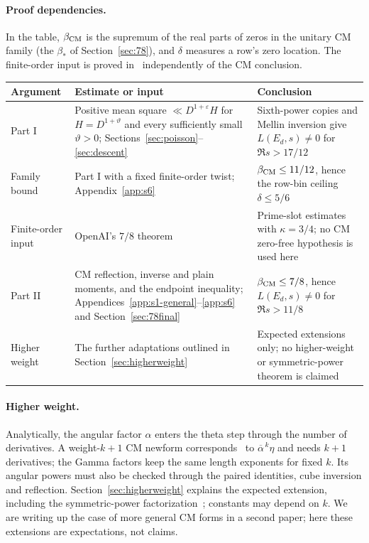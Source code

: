 \documentclass[11pt]{article}
\numberwithin{equation}{section}
\begin{document}
\noindent\begin{minipage}{\linewidth}
\paragraph{Proof dependencies.}
In the table, $\beta_{\rm CM}$ is the supremum of the real parts of zeros in the
unitary CM family (the $\beta_*$ of Section~\ref{sec:78}), and $\delta$ measures a
row's zero location. The finite-order input is proved in~\cite{OAI78} independently
of the CM conclusion.
\begin{center}
\small
\begin{tabular}{>{\raggedright\arraybackslash}p{1.9cm}>{\raggedright\arraybackslash}p{6.1cm}>{\raggedright\arraybackslash}p{6.1cm}}
\toprule
Argument & Estimate or input & Conclusion\\\midrule
Part I & Positive mean square $\ll D^{1+\varepsilon}H$ for
 $H=D^{1+\vartheta}$ and every sufficiently small $\vartheta>0$;
 Sections~\ref{sec:poisson}--\ref{sec:descent} &
 Sixth-power copies and Mellin inversion give
 $L(E_d,s)\ne0$ for $\Re s>17/12$\\
Family bound & Part I with a fixed finite-order twist;
 Appendix~\ref{app:s6} & $\beta_{\rm CM}\le11/12$, hence the row-bin ceiling
 $\delta\le5/6$\\
Finite-order input & OpenAI's $7/8$ theorem~\cite{OAI78} &
 Prime-slot estimates with $\kappa=3/4$;
 no CM zero-free hypothesis is used here\\
Part II & CM reflection, inverse and plain moments,
 and the endpoint inequality; Appendices~\ref{app:s1-general}--\ref{app:s6}
 and Section~\ref{sec:78final} & $\beta_{\rm CM}\le7/8$, hence
 $L(E_d,s)\ne0$ for $\Re s>11/8$\\
Higher weight & The further adaptations outlined in
 Section~\ref{sec:higherweight} & Expected extensions only;
 no higher-weight or symmetric-power theorem is claimed\\\bottomrule
\end{tabular}
\end{center}
\end{minipage}

\paragraph{Higher weight.} Analytically, the angular factor $\alpha$ enters the theta step
through the number of derivatives. A weight-$k+1$ CM newform corresponds~\cite{Shimura71,Ribet77}
to $\overline\alpha^{\,k}\eta$ and needs $k+1$ derivatives; the Gamma factors keep
the same length exponents for fixed $k$. Its angular powers must also be checked
through the paired identities, cube inversion and reflection.
Section~\ref{sec:higherweight} explains the expected extension, including the
symmetric-power factorization~\cite[\S3.5]{MW}; constants may depend on $k$. We are writing up the case of
more general CM forms in a second paper; here these extensions are expectations, not claims.
\end{document}
